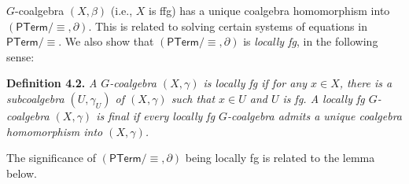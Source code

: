\hypertarget{html:S4.SS0.SSSx2.p1.m3}{}\({G}\)-coalgebra %
\hypertarget{html:S4.SS0.SSSx2.p1.m4}{}\({(X,\beta)}\) (i.e., %
\hypertarget{html:S4.SS0.SSSx2.p1.m5}{}\({X}\) is ffg) has a unique coalgebra homomorphism into %
\hypertarget{html:S4.SS0.SSSx2.p1.m6}{}\({(\mathsf{PTerm}/{\equiv},\partial)}\). This is related to solving certain systems of equations in %
\hypertarget{html:S4.SS0.SSSx2.p1.m7}{}\({\mathsf{PTerm}/{\equiv}}\). We also show that %
\hypertarget{html:S4.SS0.SSSx2.p1.m8}{}\({(\mathsf{PTerm}/{\equiv},\partial)}\) is \emph{locally fg}, in the following sense:
\par\medskip
\hypertarget{html:S4.Thmtheorem2}{} \par\noindent\textbf{\textbf{Definition 4.2}\textbf{.}}\quad  %
\hypertarget{html:S4.Thmtheorem2.p1}{} \emph{A %
\hypertarget{html:S4.Thmtheorem2.p1.m1}{}\({G}\)-coalgebra %
\hypertarget{html:S4.Thmtheorem2.p1.m2}{}\({(X,\gamma)}\) is \emph{locally fg} if for any %
\hypertarget{html:S4.Thmtheorem2.p1.m3}{}\({x\in X}\), there is a subcoalgebra %
\hypertarget{html:S4.Thmtheorem2.p1.m4}{}\({(U,\gamma_{U})}\) of %
\hypertarget{html:S4.Thmtheorem2.p1.m5}{}\({(X,\gamma)}\) such that %
\hypertarget{html:S4.Thmtheorem2.p1.m6}{}\({x\in U}\) and %
\hypertarget{html:S4.Thmtheorem2.p1.m7}{}\({U}\) is fg. A locally fg %
\hypertarget{html:S4.Thmtheorem2.p1.m8}{}\({G}\)-coalgebra %
\hypertarget{html:S4.Thmtheorem2.p1.m9}{}\({(X,\gamma)}\) is \emph{final} if every locally fg %
\hypertarget{html:S4.Thmtheorem2.p1.m10}{}\({G}\)-coalgebra admits a unique coalgebra homomorphism into %
\hypertarget{html:S4.Thmtheorem2.p1.m11}{}\({(X,\gamma)}\).}
\par\medskip
\hypertarget{html:S4.SS0.SSSx2.p2}{} The significance of %
\hypertarget{html:S4.SS0.SSSx2.p2.m1}{}\({(\mathsf{PTerm}/{\equiv},\partial)}\) being locally fg is related to the lemma below.
